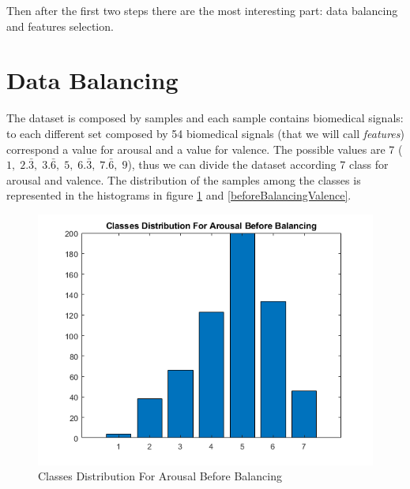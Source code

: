 \documentclass[a4paper]{report}
\begin{document}
	\noindent Then after the first two steps there are the most interesting part: data balancing and features selection.
	
	\newpage
	\section{Data Balancing}
	\noindent The dataset is composed by samples and each sample contains biomedical signals: to each different set composed by 54 biomedical signals (that we will call \textit{features}) correspond a value for arousal and a value for valence. The possible values are 7 ($1,\; 2.\bar3,\; 3.\bar6,\; 5,\; 6.\bar3,\; 7.\bar6,\; 9$), thus we can divide the dataset according 7 class for arousal and valence. The distribution of the samples among the classes is represented in the histograms in figure \ref{beforeBalancingArousal} and \ref{beforeBalancingValence}.
	
	\begin{figure}[htpb]
		\centering
		\includegraphics[scale=0.7]{img/beforeBalancingArousal.png}
		\caption{Classes Distribution For Arousal Before Balancing}
		\label{beforeBalancingArousal}
	\end{figure}  
\end{document}
